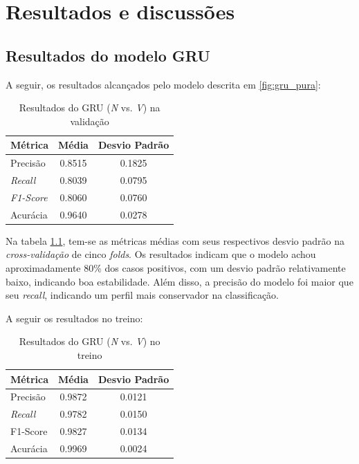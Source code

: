 \chapter{Resultados e discussões}

\section{Resultados do modelo GRU}
\label{sec:resultados_gru}

A seguir, os resultados alcançados pelo modelo descrita em \ref{fig:gru_pura}:

\begin{table}[H]
\centering
\caption{Resultados do GRU (\textit{N} vs. \textit{V}) na validação}
\label{tab:resultado_cv_gru_validacao}
\begin{tabular}{lcc}
\hline
\textbf{Métrica} & \textbf{Média} & \textbf{Desvio Padrão} \\
\hline
Precisão & 0.8515 & 0.1825 \\
\textit{Recall} & 0.8039  & 0.0795 \\
\textit{F1-Score} & 0.8060 & 0.0760 \\
Acurácia & 0.9640 & 0.0278 \\
\hline
\end{tabular}
\end{table}

Na tabela \ref{tab:resultado_cv_gru_validacao}, tem-se as métricas médias com seus respectivos desvio padrão na \textit{cross-validação} de cinco \textit{folds}.
Os resultados indicam que o modelo achou aproximadamente 80\% dos casos positivos, com um desvio padrão relativamente baixo, indicando boa estabilidade.
Além disso, a precisão do modelo foi maior que seu \textit{recall}, indicando um perfil mais conservador na classificação. 

A seguir os resultados no treino:

\begin{table}[H]
\centering
\caption{Resultados do GRU (\textit{N} vs. \textit{V}) no treino}
\label{tab:resultado_cv_gru_treino}
\begin{tabular}{lcc}
\hline
\textbf{Métrica} & \textbf{Média} & \textbf{Desvio Padrão} \\
\hline
Precisão & 0.9872 & 0.0121 \\
\textit{Recall} & 0.9782 & 0.0150 \\
F1-Score & 0.9827 & 0.0134 \\
Acurácia & 0.9969 & 0.0024 \\
\hline
\end{tabular}
\end{table}


